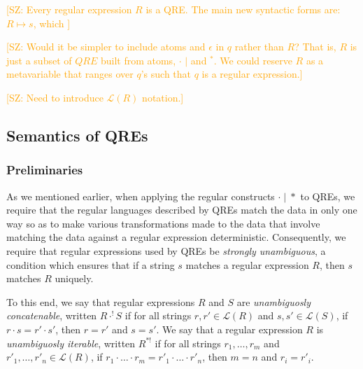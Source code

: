 \documentclass{svproc}
\newcommand{\FINISH}[3]{\ifdraft\textcolor{#1}{[#2: #3]}\fi}
\newcommand{\saz}[1]{\FINISH{orange}{SZ}{#1}}
\newcommand{\canonizer}{\ensuremath{\mathit{Canonizer}}}
\begin{document}
\saz{Every regular expression $R$ is a QRE.  The main new syntactic
forms are:
$R \mapsto s$, which }

\saz{Would it be simpler to include atoms and $\epsilon$ in $q$ rather than $R$?  That is, $R$ is
  just a subset of $QRE$ built from atoms, $\cdot$ $|$ and ${}^*$.  We could
  reserve $R$ as a metavariable that ranges over $q$'s such that $q$ is a
  regular expression.}

\saz{Need to introduce $\mathcal{L}(R)$ notation.}

\iffalse
Quotient Regular Expressions (or QREs) enable us to give richer specifications
for data formats than ordinary regular expressions. More concretely,
  All data to be transformed must match $W(q)$, the ``whole'' regular
  expression of $q$. However, before transforming the using a lens, the data
  will be quotiented out by the equivalence relation $EqRel(q)$ which has $K(q)$
  as a complete set of representatives. That is, for each string $w \in
  W(q)$, there is a unique $k \in K(q)$ such that $w \; EqRel(q) \; k$). This
  unique representative $k$ is chosen using the ``canonizing'' function
  $\canonizer(q)$.
  \fi
  
\subsection{Semantics of QREs}
\subsubsection{Preliminaries}
As we mentioned earlier, when applying the regular constructs $\cdot
\; | \;  *$ to QREs, we require that the regular languages
described by QREs match the data in only one way so as to make
various transformations made to the data that involve matching the data against
a regular expression deterministic. Consequently, we require that regular
expressions used by QREs be \textit{strongly unambiguous}, a condition which
ensures that if a string $s$ matches a regular expression $R$, then $s$ matches
$R$ uniquely.

To this end, we say that regular expressions $R$ and $S$ are
\textit{unambiguosly concatenable}, written $R \cdot^! S$ if for all strings
$r, r' \in \mathcal{L}(R)$ and $s, s' \in \mathcal{L}(S)$, if $r \cdot s = r'
\cdot s'$, then $r = r'$ and $s = s'$. We say that a regular expression $R$ is
\textit{unambiguosly iterable}, written $R^{*!}$ if for all strings $r_1,
\ldots, r_m$ and $r'_1, \ldots, r'_n \in \mathcal{L}(R)$, if $r_1 \cdot \ldots
\cdot r_m = r'_1 \cdot \ldots \cdot r'_n$, then $m = n$ and $r_i = r'_i$.
\end{document}
